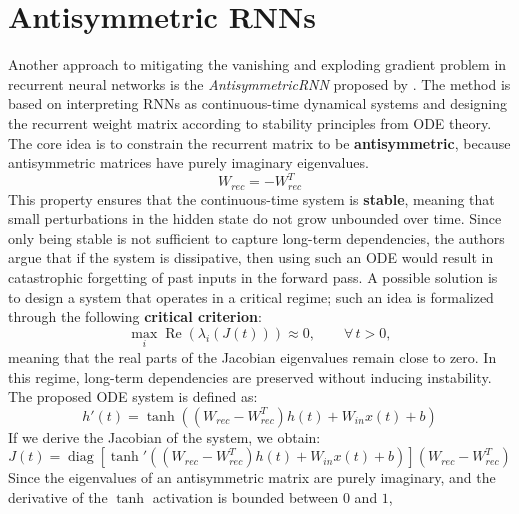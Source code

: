 \section{Antisymmetric RNNs}
\label{sec:antisymmetric_rnn}

Another approach to mitigating the vanishing and exploding gradient problem in recurrent neural networks is the
\textit{AntisymmetricRNN} proposed by \cite{chang2019antisymmetricrnndynamicalviewrecurrent}.\newline
The method is based on interpreting RNNs as continuous-time dynamical systems and designing the recurrent weight
matrix according to stability principles from ODE theory.
\newline
The core idea is to constrain the recurrent matrix to be \textbf{antisymmetric}, because antisymmetric matrices have purely imaginary eigenvalues.
\begin{equation}
    W_{rec} = - W_{rec}^T
\end{equation}
This property ensures that the continuous-time system is \textbf{stable}, meaning that small perturbations in the hidden state do not grow unbounded over time.
\newline
Since only being stable is not sufficient to capture long-term dependencies, the authors argue that if the system is dissipative,
then using such an ODE would result in catastrophic forgetting of past inputs in the forward pass.
A possible solution is to design a system that operates in a critical regime; such an idea is formalized through the following \textbf{critical criterion}:
\begin{equation}
    \max_{i} \operatorname{Re}\!\left( \lambda_i(J(t)) \right) \approx 0, 
    \qquad \forall\, t > 0,
\end{equation}
meaning that the real parts of the Jacobian eigenvalues remain close to zero.
In this regime, long-term dependencies are preserved without inducing instability.\newline
The proposed ODE system is defined as:
\begin{equation}
    h'(t) = \tanh((W_{rec} - W_{rec}^T)h(t) + W_{in}x(t) + b)
\end{equation}
\newline
If we derive the Jacobian of the system, we obtain:
\begin{equation}
    J(t) = \operatorname{diag}[{\tanh'((W_{rec} - W_{rec}^T)h(t) + W_{in}x(t) + b)}](W_{rec} - W_{rec}^T)
\end{equation}
Since the eigenvalues of an antisymmetric matrix are purely imaginary, and the derivative of the $\tanh$ activation is bounded between $0$ and $1$,
